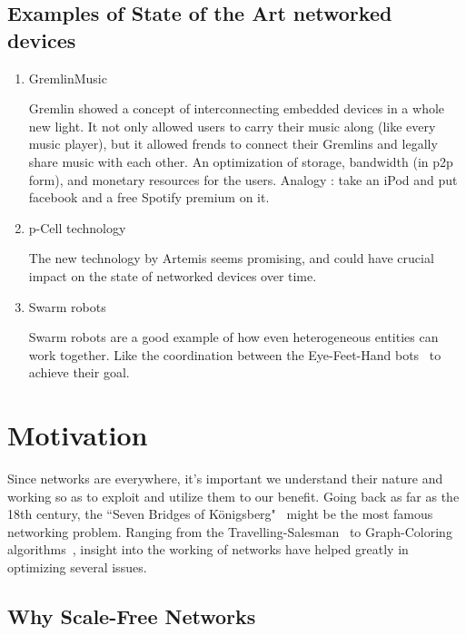\subsection{Examples of State of the Art networked devices }
\begin{enumerate}

\item GremlinMusic ~\cite{gremlin}

Gremlin showed a concept of interconnecting embedded devices in a whole new light. It not only allowed users to carry their music along (like every music player), but it allowed frends to connect their Gremlins and legally share music with each other. An optimization of storage, bandwidth (in p2p form), and monetary resources for the users.  Analogy : take an iPod and put facebook and a free Spotify premium on it.

\item p-Cell technology ~\cite{pCell}

The new technology by Artemis seems promising, and could have crucial impact on the state of networked devices over time.


\item Swarm robots 

Swarm robots are a good example of how even heterogeneous entities can work together. Like the coordination between the Eye-Feet-Hand bots~\cite{swarm..robots} to achieve their goal.

\end{enumerate}




\section{Motivation}

Since networks are everywhere, it's important we understand their nature and working so as to exploit and utilize them to our benefit.  
Going back as far as the 18th century, the ``Seven Bridges of Königsberg"~\cite{konigsberg} might be the most famous networking problem. Ranging from the Travelling-Salesman~\cite{traveling} to Graph-Coloring algorithms~\cite{graph}, insight into the working of networks have helped greatly in optimizing several issues.

\subsection{Why Scale-Free Networks}

